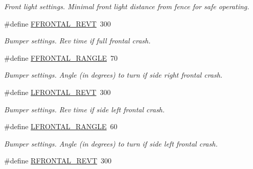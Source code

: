 \begin{DoxyCompactItemize}
\begin{DoxyCompactList}\small\item\em Front light settings. Minimal front light distance from fence for safe operating. \item\end{DoxyCompactList}\item 
\hypertarget{fence_8nxc_acb1164349a1fa4b7052e28f7c7c735d4}{
\#define \hyperlink{fence_8nxc_acb1164349a1fa4b7052e28f7c7c735d4}{FFRONTAL\_\-REVT}~300}
\label{fence_8nxc_acb1164349a1fa4b7052e28f7c7c735d4}

\begin{DoxyCompactList}\small\item\em Bumper settings. Rev time if full frontal crash. \item\end{DoxyCompactList}\item 
\hypertarget{fence_8nxc_abda398fa4722b8691dc8c52c733a2814}{
\#define \hyperlink{fence_8nxc_abda398fa4722b8691dc8c52c733a2814}{FFRONTAL\_\-RANGLE}~70}
\label{fence_8nxc_abda398fa4722b8691dc8c52c733a2814}

\begin{DoxyCompactList}\small\item\em Bumper settings. Angle (in degrees) to turn if side right frontal crash. \item\end{DoxyCompactList}\item 
\hypertarget{fence_8nxc_aac0491bc7a39228e57b85de235ef59eb}{
\#define \hyperlink{fence_8nxc_aac0491bc7a39228e57b85de235ef59eb}{LFRONTAL\_\-REVT}~300}
\label{fence_8nxc_aac0491bc7a39228e57b85de235ef59eb}

\begin{DoxyCompactList}\small\item\em Bumper settings. Rev time if side left frontal crash. \item\end{DoxyCompactList}\item 
\hypertarget{fence_8nxc_ad19631fb45582ad9441719c376c07c3b}{
\#define \hyperlink{fence_8nxc_ad19631fb45582ad9441719c376c07c3b}{LFRONTAL\_\-RANGLE}~60}
\label{fence_8nxc_ad19631fb45582ad9441719c376c07c3b}

\begin{DoxyCompactList}\small\item\em Bumper settings. Angle (in degrees) to turn if side left frontal crash. \item\end{DoxyCompactList}\item 
\hypertarget{fence_8nxc_a623033e48068d57555d513a2d56d0c40}{
\#define \hyperlink{fence_8nxc_a623033e48068d57555d513a2d56d0c40}{RFRONTAL\_\-REVT}~300}
\label{fence_8nxc_a623033e48068d57555d513a2d56d0c40}


\end{DoxyCompactItemize}
